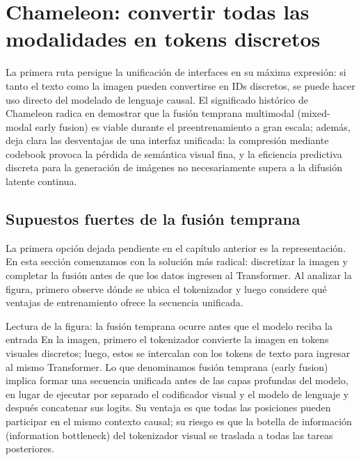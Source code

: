 \section{Chameleon: convertir todas las modalidades en tokens discretos}

La primera ruta persigue la unificación de interfaces en su máxima expresión: si tanto el texto como la imagen pueden convertirse en IDs discretos, se puede hacer uso directo del modelado de lenguaje causal. El significado histórico de Chameleon radica en demostrar que la fusión temprana multimodal (mixed-modal early fusion) es viable durante el preentrenamiento a gran escala; además, deja clara las desventajas de una interfaz unificada: la compresión mediante codebook provoca la pérdida de semántica visual fina, y la eficiencia predictiva discreta para la generación de imágenes no necesariamente supera a la difusión latente continua.

\subsection{Supuestos fuertes de la fusión temprana}

La primera opción dejada pendiente en el capítulo anterior es la representación. En esta sección comenzamos con la solución más radical: discretizar la imagen y completar la fusión antes de que los datos ingresen al Transformer. Al analizar la figura, primero observe dónde se ubica el tokenizador y luego considere qué ventajas de entrenamiento ofrece la secuencia unificada.


\begin{knowledgebox}{Lectura de la figura: la fusión temprana ocurre antes que el modelo reciba la entrada}
En la imagen, primero el tokenizador convierte la imagen en tokens visuales discretos; luego, estos se intercalan con los tokens de texto para ingresar al mismo Transformer. Lo que denominamos fusión temprana (early fusion) implica formar una secuencia unificada antes de las capas profundas del modelo, en lugar de ejecutar por separado el codificador visual y el modelo de lenguaje y después concatenar sus logits. Su ventaja es que todas las posiciones pueden participar en el mismo contexto causal; su riesgo es que la botella de información (information bottleneck) del tokenizador visual se traslada a todas las tareas posteriores.
\end{knowledgebox}

